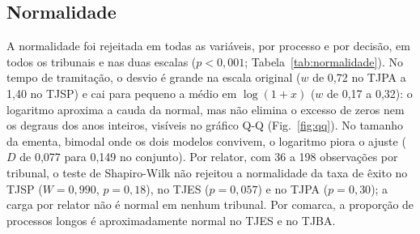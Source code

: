 \documentclass[conference]{IEEEtran}
\begin{document}
\subsection{Normalidade}

A normalidade foi rejeitada em todas as variáveis, por processo e por decisão,
em todos os tribunais e nas duas escalas ($p < 0{,}001$;
Tabela~\ref{tab:normalidade}). No tempo de tramitação, o desvio é grande na
escala original ($w$ de 0,72 no TJPA a 1,40 no TJSP) e cai para pequeno a médio
em $\log(1+x)$ ($w$ de 0,17 a 0,32): o logaritmo aproxima a cauda da normal, mas
não elimina o excesso de zeros nem os degraus dos anos inteiros, visíveis no
gráfico Q-Q (Fig.~\ref{fig:qq}). No tamanho da ementa, bimodal onde os dois
modelos convivem, o logaritmo piora o ajuste ($D$ de 0,077 para 0,149 no
conjunto). Por relator, com 36 a 198 observações por tribunal, o teste de
Shapiro-Wilk não rejeitou a normalidade da taxa de êxito no TJSP
($W = 0{,}990$, $p = 0{,}18$), no TJES ($p = 0{,}057$) e no TJPA ($p = 0{,}30$);
a carga por relator não é normal em nenhum tribunal. Por comarca, a proporção
de processos longos é aproximadamente normal no TJES e no TJBA.
\end{document}
